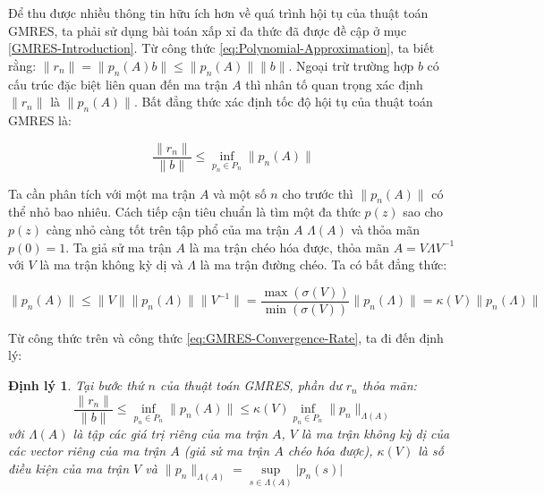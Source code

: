 \documentclass[14pt, a4paper]{article}
\numberwithin{equation}{section}
\numberwithin{algorithm}{section}
\numberwithin{figure}{section}
\newtheorem{dl}{Định lý}
\numberwithin{dl}{section}
\numberwithin{md}{section}
\numberwithin{bd}{section}
\numberwithin{dn}{section}
\begin{document}
Để thu được nhiều thông tin hữu ích hơn về quá trình hội tụ của thuật toán GMRES, ta phải sử dụng bài toán xấp xỉ đa thức đã được đề cập ở mục \ref{GMRES-Introduction}. Từ công thức \ref{eq:Polynomial-Approximation}, ta biết rằng: $\lVert r_n \rVert=\lVert p_n(A)b \rVert \leq \lVert p_n(A) \rVert \lVert b \rVert$. Ngoại trừ trường hợp $b$ có cấu trúc đặc biệt liên quan đến ma trận $A$ thì nhân tố quan trọng xác định $ \lVert r_n \rVert$ là $\lVert p_n(A) \rVert$. Bất đẳng thức xác định tốc độ hội tụ của thuật toán GMRES là:

\begin{equation} \label{eq:GMRES-Convergence-Rate}
    \dfrac{\lVert r_n \rVert}{\lVert b \rVert} \leq \inf_{p_n \in P_n} \lVert p_n(A) \rVert
\end{equation}

Ta cần phân tích với một ma trận $A$ và một số $n$ cho trước thì $\lVert p_n(A) \rVert$ có thể nhỏ bao nhiêu. Cách tiếp cận tiêu chuẩn là tìm một đa thức $p(z)$ sao cho $p(z)$ càng nhỏ càng tốt trên tập phổ của ma trận $A$ $\Lambda(A)$ và thỏa mãn $p(0)=1$. Ta giả sử ma trận $A$ là ma trận chéo hóa được, thỏa mãn $A=V\Lambda V^{-1}$ với $V$ là ma trận không kỳ dị và $\Lambda$ là ma trận đường chéo. Ta có bất đẳng thức:

\begin{equation}
    \lVert p_n(A) \rVert \leq \lVert V \rVert \lVert p_n(\Lambda) \rVert \lVert V^{-1} \rVert = \dfrac{\max(\sigma(V))}{\min(\sigma(V))} \lVert p_n(\Lambda) \rVert = \kappa(V) \lVert p_n(\Lambda) \rVert
\end{equation}

Từ công thức trên và công thức \ref{eq:GMRES-Convergence-Rate}, ta đi đến định lý:

\begin{dl} \label{dl:GMRES-Convergence-Rate}
    Tại bước thứ $n$ của thuật toán GMRES, phần dư $r_n$ thỏa mãn:
    \begin{equation}
        \dfrac{\lVert r_n \rVert}{\lVert b \rVert} \leq \inf_{p_n \in P_n} \lVert p_n(A) \rVert \leq \kappa(V) \inf_{p_n \in P_n} \lVert p_n \rVert_{\Lambda(A)}
    \end{equation}
    với $\Lambda(A)$ là tập các giá trị riêng của ma trận $A$, $V$ là ma trận không kỳ dị của các vector riêng của ma trận $A$ (giả sử ma trận $A$ chéo hóa được), $\kappa(V)$ là số điều kiện của ma trận $V$ và $\lVert p_n \rVert_{\Lambda(A)}=\underset{s \in \Lambda(A)}{\sup} \lvert p_n(s) \rvert$
\end{dl}
\end{document}
